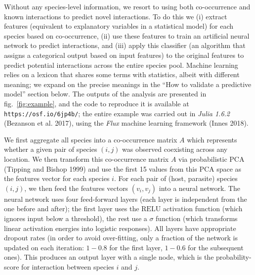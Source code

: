 \documentclass[10pt,oneside]{article}
\begin{document}
Without any species-level information, we resort to using both
co-occurrence and known interactions to predict novel interactions. To
do this we (i) extract features (equivalent to explanatory variables in
a statistical model) for each species based on co-occurrence, (ii) use
these features to train an artificial neural network to predict
interactions, and (iii) apply this classifier (an algorithm that assigns
a categorical output based on input features) to the original features
to predict potential interactions across the entire species pool.
Machine learning relies on a lexicon that shares some terms with
statistics, albeit with different meaning; we expand on the precise
meanings in the ``How to validate a predictive model'' section below.
The outputs of the analysis are presented in fig.~\ref{fig:example}, and
the code to reproduce it is available at \texttt{https://osf.io/6jp4b/};
the entire example was carried out in \emph{Julia 1.6.2} (Bezanson et
al. 2017), using the \emph{Flux} machine learning framework (Innes
2018).

We first aggregate all species into a co-occurrence matrix \(A\) which
represents whether a given pair of species \((i,j)\) was observed
coexisting across any location. We then transform this co-occurrence
matrix \(A\) via probabilistic PCA (Tipping and Bishop 1999) and use the
first 15 values from this PCA space as the features vector for each
species \(i\). For each pair of (host, parasite) species \((i,j)\), we
then feed the features vectors \((v_i, v_j)\) into a neural network. The
neural network uses four feed-forward layers (each layer is independent
from the one before and after); the first layer uses the \(\text{RELU}\)
activation function (which ignores input below a threshold), the rest
use a \(\sigma\) function (which transforms linear activation energies
into logistic responses). All layers have appropriate dropout rates (in
order to avoid over-fitting, only a fraction of the network is updated
on each iteration: \(1-0.8\) for the first layer, \(1-0.6\) for the
subsequent ones). This produces an output layer with a single node,
which is the probability-score for interaction between species \(i\) and
\(j\).
\end{document}
